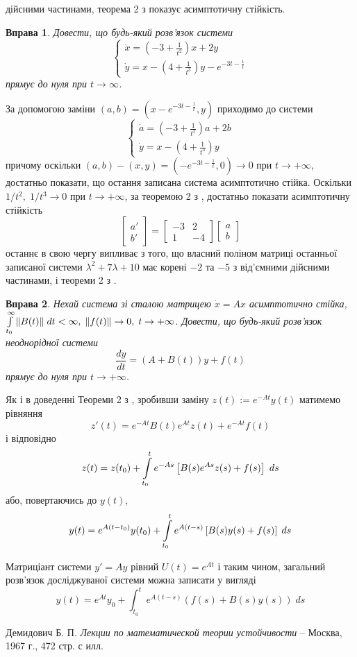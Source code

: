 \documentclass[12pt]{article} %
\newtheorem{prob}{Вправа}
\begin{document}
дійсними частинами, теорема 2 з \cite[\S8]{demidovich} показує асимптотичну стійкість.
\begin{prob}Довести, що будь-який розв’язок системи 
\[\begin{cases}\dot{x}=(-3+\frac{1}{t^2})x+2y\\\dot{y}=x-(4+\frac{1}{t^3})y-e^{-3t-\frac{1}{t}}\end{cases}\]
прямує до нуля при $t\to\infty$.\end{prob}
За допомогою заміни $(a,b)=(x-e^{-3t-\frac{1}{t}},y)$ приходимо до системи
\[\begin{cases}\dot{a}=(-3+\frac{1}{t^2})a+2b\\\dot{y}=x-(4+\frac{1}{t^3})y\end{cases}\]
причому оскільки $(a,b)-(x,y)=(-e^{-3t-\frac{1}{t}},0)\to0$ при $t\to+\infty$, достатньо показати, що остання записана
система асимптотично стійка. Оскільки
$1/t^2,\;1/t^3\to0$ при $t\to+\infty$, за теоремою 2 з \cite[\S12]{demidovich}, достатньо показати асимптотичну стійкість
\[\begin{bmatrix}a'\\b'\end{bmatrix}=\begin{bmatrix}-3&2\\1&-4\end{bmatrix}\begin{bmatrix}a\\b\end{bmatrix}\]
останнє в свою чергу випливає з того, що власний поліном матриці останньої записаної системи $\lambda^2+7\lambda+10$ має корені
$-2$ та $-5$ з від’ємними дійсними частинами, і теореми 2 з \cite[\S8]{demidovich}.
\begin{prob}Нехай система зі сталою матрицею $\dot{x}=Ax$ асимптотично стійка, $\int_{t_0}^\infty\mynorm{B(t)}\;dt<\infty,\;\mynorm{f(t)}\to0,\;
t\to+\infty$. Довести, що будь-який розв’язок неоднорідної системи
\[\frac{dy}{dt}=(A+B(t))y+f(t)\]прямує до нуля при $t\to+\infty$.\end{prob}
Як і в доведенні Теореми 2 з \cite[\S12]{demidovich}, зробивши заміну $z(t):=e^{-At}y(t)$ матимемо рівняння
\[z'(t)=e^{-At}B(t)e^{At}z(t)+e^{-At}f(t)\]
і відповідно
\[z(t)=z(t_0)+\int_{t_0}^te^{-As}\mysbra{B(s)e^{As}z(s)+f(s)}\;ds\]
або, повертаючись до $y(t)$,
\[y(t)=e^{A(t-t_0)}y(t_0)+\int_{t_0}^te^{A(t-s)}\mysbra{B(s)y(s)+f(s)}\;ds\]

Матриціант системи $y'=Ay$ рівний $U(t)=e^{At}$ і таким чином, загальний розв’язок досліджуваної системи можна записати у вигляді
\[y(t)=e^{At}y_0+\int_{t_0}^te^{A(t-s)}(f(s)+B(s)y(s))\;ds\]
\begin{thebibliography}{9}
Демидович Б. П. \emph{Лекции по математической теории устойчивости} --
Москва, 1967 г., 472 стр. с илл.
\end{thebibliography}
\end{document}
